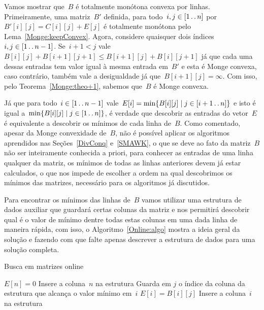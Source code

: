 Vamos mostrar que~$B$ é totalmente monótona convexa por linhas. Primeiramente, uma matriz~$B'$ definida, para todo~$i,j \in [1 \,.\,.\, n]$ por~$B'[i][j] = C[i][j] + E[j]$ é totalmente monótona pelo Lema~\ref{Monge:keepConvex}. Agora, considere quaisquer dois índices~$i,j \in [1 \,.\,.\, n-1]$. Se~$i + 1 < j$ vale~${B[i][j] + B[i+1][j+1] \leq B[i+1][j] + B[i][j+1]}$ já que cada uma dessas entradas tem valor igual à mesma entrada em~$B'$ e esta é Monge convexa, caso contrário, também vale a desigualdade já que~$B[i+1][j] = \infty$. Com isso, pelo Teorema~\ref{Monge:theo+1}, sabemos que~$B$ é Monge convexa.

Já que para todo~$i \in [1 \,.\,.\, n-1]$ vale~$E[i] = \min\{B[i][j] \mid j \in [i+1 \,.\,.\, n]\}$ e isto é igual a~$\min\{B[i][j] \mid j \in [1 \,.\,.\, n]\}$, é verdade que descobrir as entradas do vetor~$E$ é equivalente a descobrir os mínimos de cada linha de~$B$. Como comentado, apesar da Monge convexidade de~$B$, não é possível aplicar os algoritmos aprendidos nas Seções~\ref{DivConq} e~\ref{SMAWK}, o que se deve ao fato da matriz~$B$ não ser inteiramente conhecida a priori, para conhecer as entradas de uma linha qualquer da matriz, os mínimos de todas as linhas anteriores devem já estar calculados, o que nos impede de escolher a ordem na qual descobrimos os mínimos das matrizes, necessário para os algoritmos já discutidos.

Para encontrar os mínimos das linhas de~$B$ vamos utilizar uma estrutura de dados auxiliar que guardará certas colunas da matriz e nos permitirá descobrir qual é o valor de mínimo dentre todas estas colunas em uma dada linha de maneira rápida, com isso, o Algoritmo~\ref{Online:algo} mostra a ideia geral da solução e fazendo com que falte apenas descrever a estrutura de dados para uma solução completa.

\begin{algorithm}[h]
\caption{Busca em matrizes online}
\label{Online:algo}
\begin{algorithmic}[1]
    \State $E[n] = 0$
    \State Insere a coluna~$n$ na estrutura
        \State Guarda em $j$ o índice da coluna da estrutura que alcança o valor mínimo em~$i$
        \State $E[i] = B[i][j]$
        \State Insere a coluna~$i$ na estrutura
    \EndFor
\EndFunction
\end{algorithmic}
\end{algorithm}

